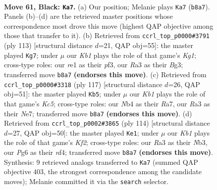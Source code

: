 \documentclass[11pt]{article}
\begin{document}
\clearpage

\begin{figure}[p]\centering
\begin{subfigure}{0.46\textwidth}\centering
\resizebox{\linewidth}{!}{%
\newchessgame
\chessboard[
  setfen={1k1R4/1p5p/6pP/p4p2/1n3P2/r7/7K/4R3 b - - 10 61},
  showmover=false,
  pgfstyle=straightmove, color=movearrow, markmove={b8-a7}
]}
\caption{}
\end{subfigure}\hfill
\begin{subfigure}{0.46\textwidth}\centering
\resizebox{\linewidth}{!}{%
\newchessgame
\chessboard[
  setfen={3R2k1/5p2/p5p1/P3p2p/7P/5Pb1/8/5K2 b - - 0 57},
  showmover=false,
  pgfstyle=straightmove, color=movearrow, markmove={g8-g7}
]}
\caption{}
\end{subfigure}
\\[4pt]
\begin{subfigure}{0.46\textwidth}\centering
\resizebox{\linewidth}{!}{%
\newchessgame
\chessboard[
  setfen={8/r3n1p1/4P2p/4K2P/p1k3P1/1p6/5R2/2R5 b - - 6 59},
  showmover=false,
  pgfstyle=straightmove, color=movearrow, markmove={c4-b5}
]}
\caption{}
\end{subfigure}\hfill
\begin{subfigure}{0.46\textwidth}\centering
\resizebox{\linewidth}{!}{%
\newchessgame
\chessboard[
  setfen={3R4/4p2p/k7/P5p1/5nP1/1N3P2/2r2K2/8 w - - 2 58},
  showmover=false,
  pgfstyle=straightmove, color=movearrow, markmove={f2-e1}
]}
\caption{}
\end{subfigure}
\caption{\textbf{Move 61, Black: \texttt{Ka7}.} (a) Our position; Melanie plays \texttt{Ka7} (\texttt{b8a7}). Panels (b)--(d) are the retrieved master positions whose correspondence most drove this move (highest QAP objective among those that transfer to it). (b) Retrieved from \texttt{ccrl\_top\_p0000\#3791} (ply 113) [structural distance $d$=21, QAP obj=55]: the master played \texttt{Kg7}; under $\mu$ our \emph{Kb1} plays the role of that game's \emph{Kg1}; cross-type roles: our \emph{r}e1 as their \emph{p}f3, our \emph{R}a3 as their \emph{B}g3; transferred move \texttt{b8a7} \textbf{(endorses this move)}. (c) Retrieved from \texttt{ccrl\_top\_p0000\#3318} (ply 117) [structural distance $d$=26, QAP obj=51]: the master played \texttt{Kb5}; under $\mu$ our \emph{Kb1} plays the role of that game's \emph{Kc5}; cross-type roles: our \emph{N}b4 as their \emph{R}a7, our \emph{R}a3 as their \emph{N}e7; transferred move \texttt{b8a7} \textbf{(endorses this move)}. (d) Retrieved from \texttt{ccrl\_top\_p0002\#3865} (ply 114) [structural distance $d$=27, QAP obj=50]: the master played \texttt{Ke1}; under $\mu$ our \emph{Kb1} plays the role of that game's \emph{Kf2}; cross-type roles: our \emph{R}a3 as their \emph{N}b3, our \emph{P}g6 as their \emph{n}f4; transferred move \texttt{b8a7} \textbf{(endorses this move)}. Synthesis: 9 retrieved analogs transferred to \texttt{Ka7} (summed QAP objective 403, the strongest correspondence among the candidate moves); Melanie committed it via the \texttt{search} selector.}
\label{fig:thought-m121}
\end{figure}
\end{document}
